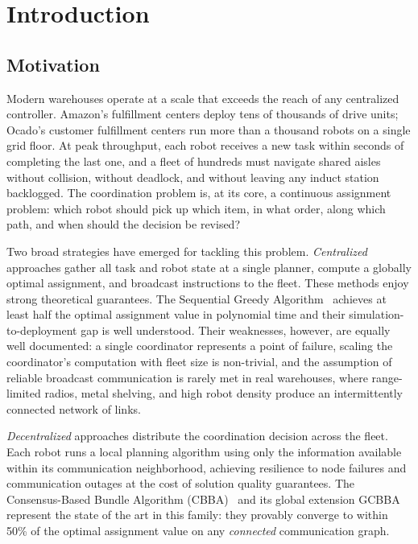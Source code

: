 \chapter{Introduction}
\label{chap:introduction}


\section{Motivation}
\label{sec:intro_motivation}

Modern warehouses operate at a scale that exceeds the reach of any centralized
controller.
Amazon's fulfillment centers deploy tens of thousands of drive units; Ocado's
customer fulfillment centers run more than a thousand robots on a single grid
floor.
At peak throughput, each robot receives a new task within seconds of completing
the last one, and a fleet of hundreds must navigate shared aisles without
collision, without deadlock, and without leaving any induct station backlogged.
The coordination problem is, at its core, a continuous assignment problem:
which robot should pick up which item, in what order, along which path, and
when should the decision be revised?

Two broad strategies have emerged for tackling this problem.
\emph{Centralized} approaches gather all task and robot state at a single
planner, compute a globally optimal assignment, and broadcast instructions to
the fleet.
These methods enjoy strong theoretical guarantees. The Sequential Greedy
Algorithm~\cite{minoux1978accelerated} achieves at least half the optimal
assignment value in polynomial time and their simulation-to-deployment gap
is well understood.
Their weaknesses, however, are equally well documented: a single coordinator
represents a point of failure, scaling the coordinator's computation with fleet
size is non-trivial, and the assumption of reliable broadcast communication
is rarely met in real warehouses, where range-limited radios, metal shelving,
and high robot density produce an intermittently connected network of links.

\emph{Decentralized} approaches distribute the coordination decision across
the fleet.
Each robot runs a local planning algorithm using only the information available
within its communication neighborhood, achieving resilience to node failures
and communication outages at the cost of solution quality guarantees.
The Consensus-Based Bundle Algorithm (CBBA)~\cite{choi2009consensus} and its
global extension GCBBA~\cite{kha2025enhancing} represent the state of the art
in this family: they provably converge to within 50\% of the optimal
assignment value on any \emph{connected} communication graph.

